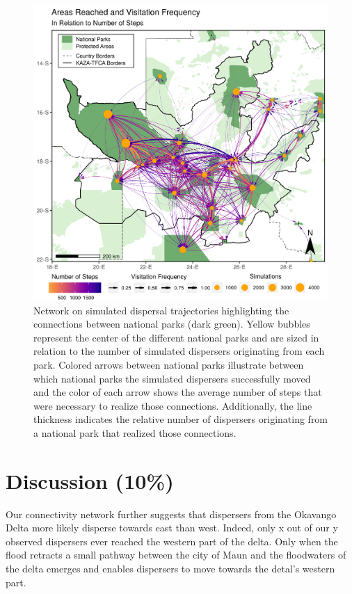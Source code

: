 \documentclass[abstract=on,10pt,a4paper,bibliography=totocnumbered]{article}
\begin{document}
\begin{figure}
  \includegraphics[width=\textwidth]{99_AreasReached.png}
  \caption{Network on simulated dispersal trajectories highlighting the
  connections between national parks (dark green). Yellow bubbles represent the
  center of the different national parks and are sized in relation to the number
  of simulated dispersers originating from each park. Colored arrows between
  national parks illustrate between which national parks the simulated
  dispersers successfully moved and the color of each arrow shows the average
  number of steps that were necessary to realize those connections.
  Additionally, the line thickness indicates the relative number of dispersers
  originating from a national park that realized those connections.}
  \label{AreasReached}
\end{figure}

\section{Discussion (10\%)}
Our connectivity network further suggests that dispersers from the Okavango
Delta more likely disperse towards east than west. Indeed, only x out of our y
observed dispersers ever reached the western part of the delta. Only when the
flood retracts a small pathway between the city of Maun and the floodwaters of
the delta emerges and enables dispersers to move towards the detal's western
part.
\end{document}
